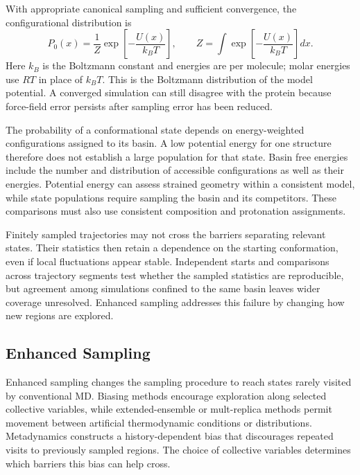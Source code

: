 With appropriate canonical sampling and sufficient convergence, the configurational distribution is
\begin{equation}
    P_0(x)=\frac{1}{Z}\exp\!\left[-\frac{U(x)}{k_BT}\right],
    \qquad Z=\int\exp\!\left[-\frac{U(x)}{k_BT}\right]dx.
    \label{eq:bg-boltzmann}
\end{equation}
Here $k_B$ is the Boltzmann constant and energies are per molecule; molar energies use $RT$ in place of $k_BT$. This is the Boltzmann distribution of the model potential.\supercite{bmsb2012ch3} A converged simulation can still disagree with the protein because force-field error persists after sampling error has been reduced.

The probability of a conformational state depends on energy-weighted configurations assigned to its basin. A low potential energy for one structure therefore does not establish a large population for that state. Basin free energies include the number and distribution of accessible configurations as well as their energies.\supercite{bmsb2012ch3} Potential energy can assess strained geometry within a consistent model, while state populations require sampling the basin and its competitors. These comparisons must also use consistent composition and protonation assignments.

Finitely sampled trajectories may not cross the barriers separating relevant states. Their statistics then retain a dependence on the starting conformation, even if local fluctuations appear stable.\supercite{hollingsworthMolecularDynamicsSimulation2018} Independent starts and comparisons across trajectory segments test whether the sampled statistics are reproducible, but agreement among simulations confined to the same basin leaves wider coverage unresolved. Enhanced sampling addresses this failure by changing how new regions are explored.

\subsection{Enhanced Sampling}
\label{sec:bg-enhanced-sampling}

Enhanced sampling changes the sampling procedure to reach states rarely visited by conventional MD. Biasing methods encourage exploration along selected collective variables, while extended-ensemble or mult-replica methods permit movement between artificial thermodynamic conditions or distributions. Metadynamics constructs a history-dependent bias that discourages repeated visits to previously sampled regions. The choice of collective variables determines which barriers this bias can help cross.\supercite{heninEnhancedSamplingMethods2022,bussiUsingMetadynamicsExplore2020}

